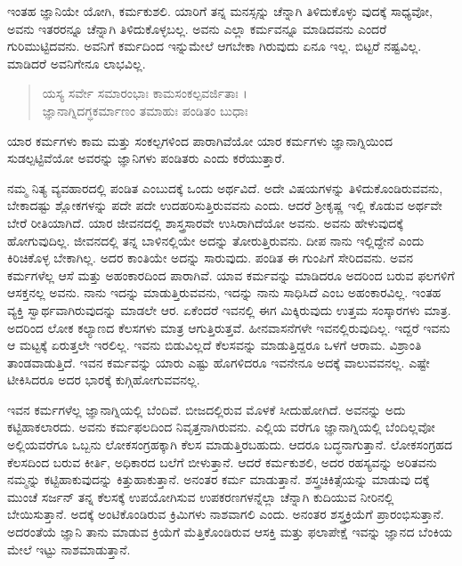 ಇಂತಹ ಜ್ಞಾನಿಯೇ ಯೋಗಿ, ಕರ್ಮಕುಶಲಿ. ಯಾರಿಗೆ ತನ್ನ ಮನಸ್ಸನ್ನು ಚೆನ್ನಾಗಿ ತಿಳಿದುಕೊಳ್ಳು ವುದಕ್ಕೆ ಸಾಧ್ಯವೋ, ಅವನು ಇತರರನ್ನೂ ಚೆನ್ನಾಗಿ ತಿಳಿದುಕೊಳ್ಳಬಲ್ಲ. ಅವನು ಎಲ್ಲಾ ಕರ್ಮವನ್ನೂ ಮಾಡಿದವನು ಎಂದರೆ ಗುರಿಮುಟ್ಟಿದವನು. ಅವನಿಗೆ ಕರ್ಮದಿಂದ ಇನ್ನುಮೇಲೆ ಆಗಬೇಕಾ ಗಿರುವುದು ಏನೂ ಇಲ್ಲ. ಬಿಟ್ಟರೆ ನಷ್ಟವಿಲ್ಲ. ಮಾಡಿದರೆ ಅವನಿಗೇನೂ ಲಾಭವಿಲ್ಲ.

\begin{verse}
ಯಸ್ಯ ಸರ್ವೇ ಸಮಾರಂಭಾಃ ಕಾಮಸಂಕಲ್ಪವರ್ಜಿತಾಃ ।\\ಜ್ಞಾನಾಗ್ನಿದಗ್ಧಕರ್ಮಾಣಂ ತಮಾಹುಃ ಪಂಡಿತಂ ಬುಧಾಃ 
\end{verse}

{\small ಯಾರ ಕರ್ಮಗಳು ಕಾಮ ಮತ್ತು ಸಂಕಲ್ಪಗಳಿಂದ ಪಾರಾಗಿವೆಯೋ ಯಾರ ಕರ್ಮಗಳು ಜ್ಞಾನಾಗ್ನಿಯಿಂದ ಸುಡಲ್ಪಟ್ಟಿವೆಯೋ ಅವರನ್ನು ಜ್ಞಾನಿಗಳು ಪಂಡಿತರು ಎಂದು ಕರೆಯುತ್ತಾರೆ.}

ನಮ್ಮ ನಿತ್ಯ ವ್ಯವಹಾರದಲ್ಲಿ ಪಂಡಿತ ಎಂಬುದಕ್ಕೆ ಒಂದು ಅರ್ಥವಿದೆ. ಅದೇ ವಿಷಯಗಳನ್ನು ತಿಳಿದುಕೊಂಡಿರುವವನು, ಬೇಕಾದಷ್ಟು ಶ್ಲೋಕಗಳನ್ನು ಪದೇ ಪದೇ ಉದಹರಿಸುತ್ತಿರುವವನು ಎಂದು. ಆದರೆ ಶ್ರೀಕೃಷ್ಣ ಇಲ್ಲಿ ಕೊಡುವ ಅರ್ಥವೇ ಬೇರೆ ರೀತಿಯಾಗಿದೆ. ಯಾರ ಜೀವನದಲ್ಲಿ ಶಾಸ್ತ್ರಸಾರವೇ ಉಸಿರಾಗಿದೆಯೋ ಅವನು. ಅವನು ಹೇಳುವುದಕ್ಕೆ ಹೋಗುವುದಿಲ್ಲ. ಜೀವನದಲ್ಲಿ ತನ್ನ ಬಾಳಿನಲ್ಲಿಯೇ ಅದನ್ನು ತೋರುತ್ತಿರುವನು. ದೀಪ ನಾನು ಇಲ್ಲಿದ್ದೇನೆ ಎಂದು ಕಿರಿಚಿಕೊಳ್ಳ ಬೇಕಾಗಿಲ್ಲ. ಅದರ ಕಾಂತಿಯೇ ಅದನ್ನು ಸಾರುವುದು. ಪಂಡಿತ ಈ ಗುಂಪಿಗೆ ಸೇರಿದವನು. ಅವನ ಕರ್ಮಗಳೆಲ್ಲ ಆಸೆ ಮತ್ತು ಅಹಂಕಾರದಿಂದ ಪಾರಾಗಿವೆ. ಯಾವ ಕರ್ಮವನ್ನು ಮಾಡಿದರೂ ಅದರಿಂದ ಬರುವ ಫಲಗಳಿಗೆ ಆಸಕ್ತನಲ್ಲ ಅವನು. ನಾನು ಇದನ್ನು ಮಾಡುತ್ತಿರುವವನು, ಇದನ್ನು ನಾನು ಸಾಧಿಸಿದೆ ಎಂಬ ಅಹಂಕಾರವಿಲ್ಲ. ಇಂತಹ ವ್ಯಕ್ತಿ ಸ್ವಾರ್ಥವಾಗಿರುವುದನ್ನು ಮಾಡಲೇ ಆರ. ಏಕೆಂದರೆ ಇವನಲ್ಲಿ ಈಗ ಮಿಕ್ಕಿರುವುದು ಉತ್ತಮ ಸಂಸ್ಕಾರಗಳು ಮಾತ್ರ. ಅದರಿಂದ ಲೋಕ ಕಲ್ಯಾಣದ ಕೆಲಸಗಳು ಮಾತ್ರ ಆಗುತ್ತಿರುತ್ತವೆ. ಹೀನವಾಸನೆಗಳೇ ಇವನಲ್ಲಿರುವುದಿಲ್ಲ. ಇದ್ದರೆ ಇವನು ಆ ಮಟ್ಟಕ್ಕೆ ಏರುತ್ತಲೇ ಇರಲಿಲ್ಲ. ಇವನು ಬಿಡುವಿಲ್ಲದೆ ಕೆಲಸವನ್ನು ಮಾಡುತ್ತಿದ್ದರೂ ಒಳಗೆ ಆರಾಮ. ವಿಶ್ರಾಂತಿ ತಾಂಡವಾಡುತ್ತಿದೆ. ಇವನ ಕರ್ಮವನ್ನು ಯಾರು ಎಷ್ಟು ಹೊಗಳಿದರೂ ಇವನೇನೂ ಅದಕ್ಕೆ ವಾಲುವವನಲ್ಲ. ಎಷ್ಟೇ ಟೀಕಿಸಿದರೂ ಅದರ ಭಾರಕ್ಕೆ ಕುಗ್ಗಿಹೋಗುವವನಲ್ಲ.

ಇವನ ಕರ್ಮಗಳೆಲ್ಲ ಜ್ಞಾನಾಗ್ನಿಯಲ್ಲಿ ಬೆಂದಿವೆ. ಬೀಜದಲ್ಲಿರುವ ಮೊಳಕೆ ಸೀದುಹೋಗಿದೆ. ಅವನನ್ನು ಅದು ಕಟ್ಟಿಹಾಕಲಾರದು. ಅವನು ಕರ್ಮಫಲದಿಂದ ನಿವೃತ್ತನಾಗಿರುವನು. ಎಲ್ಲಿಯ ವರೆಗೂ ಜ್ಞಾನಾಗ್ನಿಯಲ್ಲಿ ಬೆಂದಿಲ್ಲವೋ ಅಲ್ಲಿಯವರೆಗೂ ಒಬ್ಬನು ಲೋಕಸಂಗ್ರಹಕ್ಕಾಗಿ ಕೆಲಸ ಮಾಡುತ್ತಿರಬಹುದು. ಆದರೂ ಬದ್ಧನಾಗುತ್ತಾನೆ. ಲೋಕಸಂಗ್ರಹದ ಕೆಲಸದಿಂದ ಬರುವ ಕೀರ್ತಿ, ಅಧಿಕಾರದ ಬಲೆಗೆ ಬೀಳುತ್ತಾನೆ. ಆದರೆ ಕರ್ಮಕುಶಲಿ, ಅದರ ರಹಸ್ಯವನ್ನು ಅರಿತವನು ನಮ್ಮನ್ನು ಕಟ್ಟಿಹಾಕುವುದನ್ನು ಕಿತ್ತುಹಾಕುತ್ತಾನೆ. ಅನಂತರ ಕರ್ಮ ಮಾಡುತ್ತಾನೆ. ಶಸ್ತ್ರಚಿಕಿತ್ಸೆಯನ್ನು ಮಾಡುವು ದಕ್ಕೆ ಮುಂಚೆ ಸರ್ಜನ್ ತನ್ನ ಕೆಲಸಕ್ಕೆ ಉಪಯೋಗಿಸುವ ಉಪಕರಣಗಳನ್ನೆಲ್ಲಾ ಚೆನ್ನಾಗಿ ಕುದಿಯುವ ನೀರಿನಲ್ಲಿ ಬೇಯಿಸುತ್ತಾನೆ. ಅದಕ್ಕೆ ಅಂಟಿಕೊಂಡಿರುವ ಕ್ರಿಮಿಗಳು ನಾಶವಾಗಲಿ ಎಂದು. ಅನಂತರ ಶಸ್ತ್ರಕ್ರಿಯೆಗೆ ಪ್ರಾರಂಭಿಸುತ್ತಾನೆ. ಅದರಂತೆಯೆ ಜ್ಞಾನಿ ತಾನು ಮಾಡುವ ಕ್ರಿಯೆಗೆ ಮೆತ್ತಿಕೊಂಡಿರುವ ಆಸಕ್ತಿ ಮತ್ತು ಫಲಾಪೇಕ್ಷೆ ಇವನ್ನು ಜ್ಞಾನದ ಬೆಂಕಿಯ ಮೇಲೆ ಇಟ್ಟು ನಾಶಮಾಡುತ್ತಾನೆ.

